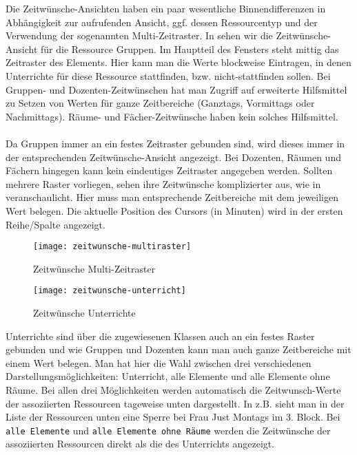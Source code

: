 \noindent
Die Zeitwünsche-Ansichten haben ein paar wesentliche Binnendifferenzen in Abhängigkeit zur aufrufenden Ansicht, ggf. dessen Ressourcentyp und der Verwendung der sogenannten Multi-Zeitraster. In  sehen wir die Zeitwünsche- Ansicht für die Ressource Gruppen. Im Hauptteil des Fensters steht mittig das Zeitraster des Elements. Hier kann man die Werte blockweise Eintragen, in denen Unterrichte für diese Ressource stattfinden, bzw. nicht-stattfinden sollen. Bei Gruppen- und Dozenten-Zeitwünschen hat man Zugriff auf erweiterte Hilfsmittel zu Setzen von Werten für ganze Zeitbereiche (Ganztags, Vormittags oder Nachmittags). Räume- und Fächer-Zeitwünsche haben kein solches Hilfsmittel.\\
\\
Da Gruppen immer an ein festes Zeitraster gebunden sind, wird dieses immer in der entsprechenden Zeitwünsche-Ansicht angezeigt. Bei Dozenten, Räumen und Fächern hingegen kann kein eindeutiges Zeitraster angegeben werden. Sollten mehrere Raster vorliegen, sehen ihre Zeitwünsche komplizierter aus, wie in  veranschaulicht. Hier muss man entsprechende Zeitbereiche mit dem jeweiligen Wert belegen. Die aktuelle Position des Cursors (in Minuten) wird in der ersten Reihe/Spalte angezeigt.

\begin{figure}[h]
	\texttt{[image: zeitwunsche-multiraster]}
	\vspace{-15pt}
	\caption{Zeitwünsche Multi-Zeitraster}
	\label{fig:zeitwunsche-multiraster}
\end{figure}

\begin{wrapfigure}{r}{0.3\textwidth}
	\texttt{[image: zeitwunsche-unterricht]}
	\vspace{-15pt}
	\caption{Zeitwünsche Unterrichte}
	\label{fig:zeitwunsche-unterricht}
\end{wrapfigure}

\noindent
Unterrichte sind über die zugewiesenen Klassen auch an ein festes Raster gebunden und wie Gruppen und Dozenten kann man auch ganze Zeitbereiche mit einem Wert belegen. Man hat hier die Wahl zwischen drei verschiedenen Darstellungsmöglichkeiten: Unterricht, alle Elemente und alle Elemente ohne Räume. Bei allen drei Möglichkeiten werden automatisch die Zeitwunsch-Werte der assoziierten Ressourcen tageweise unten dargestellt. In  z.B. sieht man in der Liste der Ressourcen unten eine Sperre bei Frau Just Montags im 3. Block. Bei \texttt{alle Elemente} und \texttt{alle Elemente ohne Räume} werden die Zeitwünsche der assoziierten Ressourcen direkt als die des Unterrichts angezeigt. 

